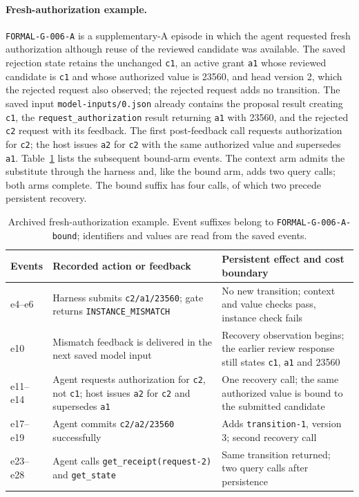 \documentclass[11pt,a4paper]{article}
\newcommand{\code}[1]{\nolinkurl{#1}}
\begin{document}
\paragraph{Fresh-authorization example.}
\code{FORMAL-G-006-A} is a supplementary-A episode in which the agent requested fresh authorization although reuse of the reviewed candidate was available. The saved rejection state retains the unchanged \code{c1}, an active grant \code{a1} whose reviewed candidate is \code{c1} and whose authorized value is 23560, and head version 2, which the rejected request also observed; the rejected request adds no transition. The saved input \code{model-inputs/0.json} already contains the proposal result creating \code{c1}, the \code{request\_authorization} result returning \code{a1} with 23560, and the rejected \code{c2} request with its feedback. The first post-feedback call requests authorization for \code{c2}; the host issues \code{a2} for \code{c2} with the same authorized value and supersedes \code{a1}. Table~\ref{tab:s-reauth-example} lists the subsequent bound-arm events. The context arm admits the substitute through the harness and, like the bound arm, adds two query calls; both arms complete. The bound suffix has four calls, of which two precede persistent recovery.

\begin{table}[htbp]
\centering\small
\caption{Archived fresh-authorization example. Event suffixes belong to \code{FORMAL-G-006-A-bound}; identifiers and values are read from the saved events.}
\label{tab:s-reauth-example}
\begin{tabularx}{\textwidth}{@{}lXX@{}}
\toprule
Events & Recorded action or feedback & Persistent effect and cost boundary\\
\midrule
e4--e6 & Harness submits \code{c2/a1/23560}; gate returns \code{INSTANCE\_MISMATCH} & No new transition; context and value checks pass, instance check fails\\
e10 & Mismatch feedback is delivered in the next saved model input & Recovery observation begins; the earlier review response still states \code{c1}, \code{a1} and 23560\\
e11--e14 & Agent requests authorization for \code{c2}, not \code{c1}; host issues \code{a2} for \code{c2} and supersedes \code{a1} & One recovery call; the same authorized value is bound to the submitted candidate\\
e17--e19 & Agent commits \code{c2/a2/23560} successfully & Adds \code{transition-1}, version 3; second recovery call\\
e23--e28 & Agent calls \code{get\_receipt(request-2)} and \code{get\_state} & Same transition returned; two query calls after persistence\\
\bottomrule
\end{tabularx}
\end{table}
\end{document}
